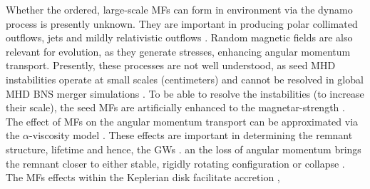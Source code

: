 Whether the ordered, large-scale \acp{MF} can form in \pmerg{} environment 
via the dynamo process is presently unknown. They are important in producing 
polar collimated outflows, jets \citep{Bucciantini:2011kx,Ruiz:2016rai} and mildly relativistic 
outflows \citep{Metzger:2018qfl,Fernandez:2018kax}. Random magnetic fields are also 
relevant for \pmerg{} evolution, as they generate stresses, enhancing angular momentum transport. 
Presently, these processes are not well understood, as seed \ac{MHD} instabilities operate at 
small scales (centimeters) and cannot be resolved in global \ac{MHD} \ac{BNS} merger 
simulations
.
To be able to resolve the instabilities (to increase their scale), the seed \acp{MF} are 
artificially enhanced to the magnetar-strength \citep{Kiuchi:2015sga,Kiuchi:2017zzg}.
%
The effect of \acp{MF} on the angular momentum transport can be approximated via 
the $\alpha$-viscosity model \citep{Shakura:1972te}. 
These effects are important 
in determining the remnant structure, lifetime and hence, the \pmerg{} \acp{GW} 
\citep{Radice:2017zta,Shibata:2017xht}. 
an the loss of angular momentum brings the remnant closer to either stable, 
rigidly rotating configuration or collapse \citep{Hotokezaka:2013iia}. 
%
The \acp{MF} effects within the Keplerian disk facilitate accretion 
\citep{Fernandez:2015use,Fujibayashi:2017puw,Fernandez:2018kax,Miller:2019dpt},


